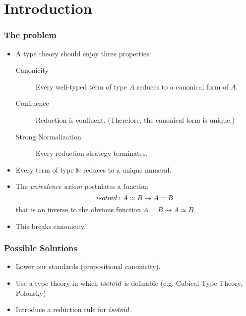 \section{Introduction}

\begin{frame}
\frametitle{The problem}
\begin{itemize}
\item
A type theory should enjoy three properties:
\begin{description}
\item[Canonicity] Every well-typed term of type $A$ reduces to a canonical form of $A$.
\item[Confluence] Reduction is confluent.  (Therefore, the canonical form is unique.)
\item[Strong Normalization] Every reduction strategy terminates.
\end{description}
\item
Every term of type $\mathbb{N}$ reduces to a unique numeral.
\item 
The \emph{univalence axiom} postulates a function
\[ isotoid : A \simeq B \rightarrow A = B \]
that is an inverse to the obvious function $A = B \rightarrow A \simeq B$.
\item
This breaks canonicity.
\end{itemize}
\end{frame}

\begin{frame}
\frametitle{Possible Solutions}
\begin{itemize}
\item
Lower our standards (propositional canonicity).
\item
Use a type theory in which $isotoid$ is definable (e.g. Cubical Type Theory, Polonsky) %
\item
Introduce a reduction rule for $isotoid$.
\end{itemize}
\end{frame}

